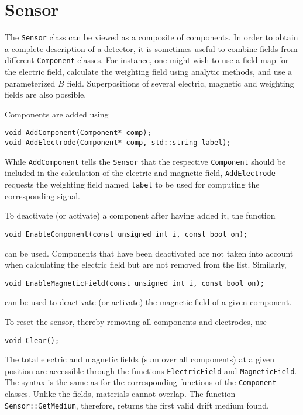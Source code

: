 \section{Sensor}

The \texttt{Sensor} class can be viewed as a composite of components. 
In order to obtain a complete description of a detector, 
it is sometimes useful to combine fields from different 
\texttt{Component} classes.
For instance, one might wish to use a field map for the electric field, 
calculate the weighting field using analytic methods, 
and use a parameterized \(B\) field. 
Superpositions of several electric, magnetic and weighting fields are also possible. 


Components are added using
\begin{lstlisting}
void AddComponent(Component* comp);
void AddElectrode(Component* comp, std::string label);
\end{lstlisting}
While \texttt{AddComponent} tells the \texttt{Sensor} that the 
respective \texttt{Component} should be included in the calculation 
of the electric and magnetic field, 
\texttt{AddElectrode} requests the weighting field named \texttt{label} 
to be used for computing the corresponding signal.

To deactivate (or activate) a component after having added it, the 
function
\begin{lstlisting}
void EnableComponent(const unsigned int i, const bool on);
\end{lstlisting}
can be used. Components that have been deactivated are not taken into 
account when calculating the electric field but are not removed from the list.
Similarly, 
\begin{lstlisting}
void EnableMagneticField(const unsigned int i, const bool on);
\end{lstlisting}
can be used to deactivate (or activate) the magnetic field of a 
given component. 

To reset the sensor, thereby removing all components and electrodes, use
\begin{lstlisting}
void Clear();
\end{lstlisting}

The total electric and magnetic fields 
(sum over all components) at a given position are accessible through 
the functions \texttt{ElectricField} and \texttt{MagneticField}.
The syntax is the same as for the corresponding functions of the 
\texttt{Component} classes.
Unlike the fields, materials cannot overlap. 
The function \texttt{Sensor::GetMedium}, therefore, 
returns the first valid drift medium found. 
 

